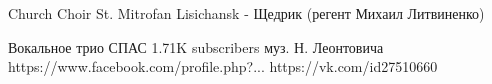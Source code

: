 



Church Choir St. Mitrofan Lisichansk - Щедрик (регент Михаил Литвиненко)

Вокальное трио СПАС
1.71K subscribers
муз. Н. Леонтовича
https://www.facebook.com/profile.php?...
https://vk.com/id27510660









